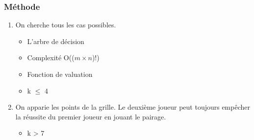 \documentclass{beamer}
\begin{document}
\begin{frame}[t]
    \frametitle{Méthode}
    \begin{enumerate}
        \item On cherche tous les cas possibles.
            \begin{itemize}
                \item L'arbre de décision
                    \pause
                \item Complexité O(($m \times n$)!)
                    \pause
                \item{Fonction de valuation}
                    \pause
                \item k $\le$ 4
            \end{itemize}
        \item<6->On apparie les points de la grille. Le deuxième joueur peut toujours empêcher la réussite du premier joueur en jouant le pairage.
            \begin{itemize}
                \item<7-> k > 7
            \end{itemize}

    \end{enumerate}
    \cleargoban
\end{frame}
\end{document}
